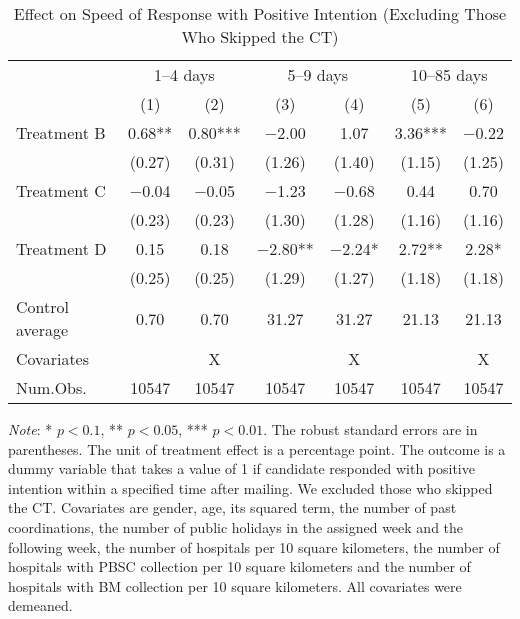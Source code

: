 \documentclass[12pt, a4paper]{article}
\begin{document}
\begin{table}[H]

\caption{\label{tab:lm-positive-time-decompose-noskip}Effect on Speed of Response with Positive Intention (Excluding Those Who Skipped the CT)}
\centering
\fontsize{8}{10}\selectfont
\begin{threeparttable}
\begin{tabular}[t]{lcccccc}
\toprule
\multicolumn{1}{c}{ } & \multicolumn{2}{c}{1--4 days} & \multicolumn{2}{c}{5--9 days} & \multicolumn{2}{c}{10--85 days} \\
\cmidrule(l{3pt}r{3pt}){2-3} \cmidrule(l{3pt}r{3pt}){4-5} \cmidrule(l{3pt}r{3pt}){6-7}
  & (1) & (2) & (3) & (4) & (5) & (6)\\
\midrule
Treatment B & \num{0.68}** & \num{0.80}*** & \num{-2.00} & \num{1.07} & \num{3.36}*** & \num{-0.22}\\
 & (\num{0.27}) & (\num{0.31}) & (\num{1.26}) & (\num{1.40}) & (\num{1.15}) & (\num{1.25})\\
Treatment C & \num{-0.04} & \num{-0.05} & \num{-1.23} & \num{-0.68} & \num{0.44} & \num{0.70}\\
 & (\num{0.23}) & (\num{0.23}) & (\num{1.30}) & (\num{1.28}) & (\num{1.16}) & (\num{1.16})\\
Treatment D & \num{0.15} & \num{0.18} & \num{-2.80}** & \num{-2.24}* & \num{2.72}** & \num{2.28}*\\
 & (\num{0.25}) & (\num{0.25}) & (\num{1.29}) & (\num{1.27}) & (\num{1.18}) & (\num{1.18})\\
\midrule
Control average & 0.70 & 0.70 & 31.27 & 31.27 & 21.13 & 21.13\\
Covariates &  & X &  & X &  & X\\
Num.Obs. & \num{10547} & \num{10547} & \num{10547} & \num{10547} & \num{10547} & \num{10547}\\
\bottomrule
\end{tabular}
\begin{tablenotes}
\item \emph{Note}: * $p < 0.1$, ** $p < 0.05$, *** $p < 0.01$. The robust standard errors are in parentheses. The unit of treatment effect is a percentage point. The outcome is a dummy variable that takes a value of 1 if candidate responded with positive intention within a specified time after mailing. We excluded those who skipped the CT. Covariates are gender, age, its squared term, the number of past coordinations, the number of public holidays in the assigned week and the following week, the number of hospitals per 10 square kilometers, the number of hospitals with PBSC collection per 10 square kilometers and the number of hospitals with BM collection per 10 square kilometers. All covariates were demeaned.
\end{tablenotes}
\end{threeparttable}
\end{table}
\end{document}
